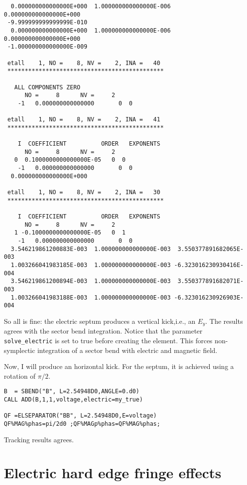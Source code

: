 \documentclass[11pt]{article} %
\begin{document}
\begin{verbatim}
  0.000000000000000E+000  1.000000000000000E-006  0.000000000000000E+000
 -9.999999999999999E-010
  0.000000000000000E+000  1.000000000000000E-006  0.000000000000000E+000
 -1.000000000000000E-009

 etall    1, NO =    8, NV =    2, INA =   40
 *********************************************

   ALL COMPONENTS ZERO
      NO =     8      NV =     2
    -1   0.000000000000000       0  0

 etall    1, NO =    8, NV =    2, INA =   41
 *********************************************

    I  COEFFICIENT          ORDER   EXPONENTS
      NO =     8      NV =     2
   0  0.1000000000000000E-05   0  0
    -1   0.000000000000000       0  0
  0.000000000000000E+000

 etall    1, NO =    8, NV =    2, INA =   30
 *********************************************

    I  COEFFICIENT          ORDER   EXPONENTS
      NO =     8      NV =     2
   1 -0.1000000000000000E-05   0  1
    -1   0.000000000000000       0  0
  3.546219861200883E-003  1.000000000000000E-003  3.550377891682065E-003
  1.003266041983185E-003  1.000000000000000E-003 -6.323016230930416E-004
  3.546219861200894E-003  1.000000000000000E-003  3.550377891682071E-003
  1.003266041983188E-003  1.000000000000000E-003 -6.323016230926903E-004
\end{verbatim}

So all is fine: the electric septum produces a vertical kick,i.e., an $E_y$. The results agrees with the sector bend integration. Notice that the parameter {\tt solve_electric} is set to true before creating the element. This forces non-symplectic integration of a sector bend with electric and magnetic field.

Now, I will produce an horizontal kick. For the septum, it is achieved using a rotation of $\pi /2$.

\begin{verbatim}
B  = SBEND("B", L=2.54948D0,ANGLE=0.d0)  
CALL ADD(B,1,1,voltage,electric=my_true)

QF =ELSEPARATOR("BB", L=2.54948D0,E=voltage)
QF%MAG%phas=pi/2d0 ;QF%MAGp%phas=QF%MAG%phas;
\end{verbatim}

Tracking results  agrees.

\section{Electric hard edge fringe effects}
\end{document}
